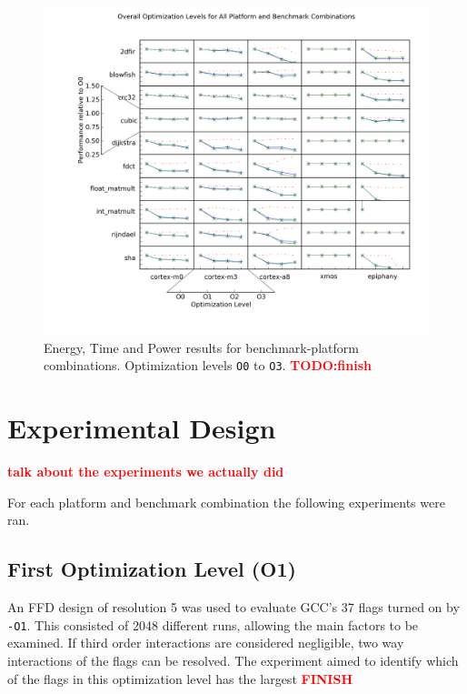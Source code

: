 \documentclass[twocolumn]{article}
\newcommand{\todo}[1]{\textbf{\textcolor{red}{#1}}}
\begin{document}
\begin{figure}[tb!]
	\centering
	\includegraphics[width=\textwidth,clip, trim=2cm 1.5cm 0 0]{levels.png}
	\caption{Energy, Time and Power results for benchmark-platform combinations. Optimization levels \texttt{O0} to \texttt{O3}. \todo{TODO:finish}}
	\label{Fig:OverallView}
\end{figure}

\section*{Experimental Design}

\todo{talk about the experiments we actually did}

For each platform and benchmark combination the following experiments were ran.

\subsection*{First Optimization Level (O1)}

An FFD design of resolution 5 was used to evaluate GCC's 37 flags turned on by \texttt{-O1}. This consisted of 2048 different runs, allowing the main factors to be examined. If third order interactions are considered negligible, two way interactions of the flags can be resolved. The experiment aimed to identify which of the flags in this optimization level has the largest \todo{FINISH}
\end{document}
